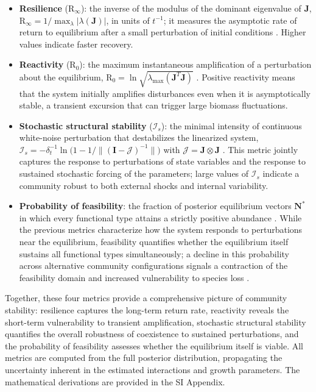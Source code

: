 \documentclass[12pt]{article}
\begin{document}
\begin{itemize}[nosep]
	\item \textbf{Resilience} ($\mathrm{R}_{\infty}$): the inverse of the modulus of the dominant eigenvalue of $\mathbf{J}$, $\mathrm{R}_{\infty}=1/\max_{\lambda}|\lambda(\mathbf{J})|$, in units of $t^{-1}$; it measures the asymptotic rate of return to equilibrium after a small perturbation of initial conditions \citep{Ives2003,Arnoldi2016a}. Higher values indicate faster recovery.
	\item \textbf{Reactivity} ($\mathrm{R}_{0}$): the maximum instantaneous amplification of a perturbation about the equilibrium, $\mathrm{R}_{0}=\ln\!\sqrt{\lambda_{\max}(\mathbf{J}^{T}\mathbf{J})}$ \citep{Snyder2010a}. Positive reactivity means that the system initially amplifies disturbances even when it is asymptotically stable, a transient excursion that can trigger large biomass fluctuations.
	\item \textbf{Stochastic structural stability} ($\mathcal{I}_{s}$): the minimal intensity of continuous white-noise perturbation that destabilizes the linearized system, $\mathcal{I}_{s}=-\delta_{t}^{-1}\ln\!\bigl(1-1/\lVert(\mathbf{I}-\mathcal{J})^{-1}\rVert\bigr)$ with $\mathcal{J}=\mathbf{J}\otimes\mathbf{J}$ \citep{Arnoldi2016b}. This metric jointly captures the response to perturbations of state variables and the response to sustained stochastic forcing of the parameters; large values of $\mathcal{I}_{s}$ indicate a community robust to both external shocks and internal variability.
	\item \textbf{Probability of feasibility}: the fraction of posterior equilibrium vectors $\mathbf{N}^{*}$ in which every functional type attains a strictly positive abundance \citep{Almaraz2024}. While the previous metrics characterize how the system responds to perturbations near the equilibrium, feasibility quantifies whether the equilibrium itself sustains all functional types simultaneously; a decline in this probability across alternative community configurations signals a contraction of the feasibility domain and increased vulnerability to species loss \citep{Almaraz2024}.
\end{itemize}

Together, these four metrics provide a comprehensive picture of community stability: resilience captures the long-term return rate, reactivity reveals the short-term vulnerability to transient amplification, stochastic structural stability quantifies the overall robustness of coexistence to sustained perturbations, and the probability of feasibility assesses whether the equilibrium itself is viable. All metrics are computed from the full posterior distribution, propagating the uncertainty inherent in the estimated interactions and growth parameters. The mathematical derivations are provided in the SI Appendix.
\end{document}
